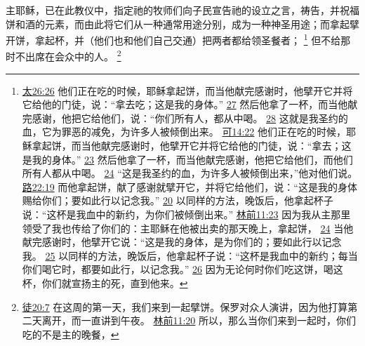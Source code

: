 \documentclass[12pt, a4paper, oneside]{ctexart}
\newcounter{parnum}[section]
\newcommand{\N}{%
   \noindent\refstepcounter{parnum}%
    \makebox[\parindent][l]{\textbf{\arabic{parnum}.}}}
\begin{document}
\N 主耶稣，已在此教仪中，指定祂的牧师们向子民宣告祂的设立之言，祷告，并祝福饼和酒的元素，而由此将它们从一种通常用途分别，成为一种神圣用途；而拿起擘开饼，拿起杯，并（他们也和他们自己交通）把两者都给领圣餐者；
	\footnote {
		\href{https://biblehub.com/matthew/26-26.htm}{太26:26} 他们正在吃的时候，耶稣拿起饼，而当他献完感谢时，他擘开它并将它给他的门徒，说：“拿去吃；这是我的身体。”
		\href{https://biblehub.com/matthew/26-27.htm}{27} 然后他拿了一杯，而当他献完感谢，他把它给他们，说：“你们所有人，都从中喝。
		\href{https://biblehub.com/matthew/26-28.htm}{28} 这就是我圣约的血，它为罪恶的减免，为许多人被倾倒出来。
		\href{https://biblehub.com/mark/14-22.htm}{可14:22} 他们正在吃的时候，耶稣拿起饼，而当他献完感谢时，他擘开它并将它给他的门徒，说：“拿去；这是我的身体。”
		\href{https://biblehub.com/mark/14-23.htm}{23} 然后他拿了一杯，而当他献完感谢，他把它给他们，而他们所有人都从中喝。
		\href{https://biblehub.com/mark/14-24.htm}{24} “这是我圣约的血，为许多人被倾倒出来，”他对他们说。
		\href{https://biblehub.com/luke/22-19.htm}{路22:19} 而他拿起饼，献了感谢就擘开它，并将它给他们，说：“这是我的身体赐给你们；要如此行以记念我。”
		\href{https://biblehub.com/luke/22-20.htm}{20} 以同样的方法，晚饭后，他拿起杯子说：“这杯是我血中的新约，为你们被倾倒出来。”
		\href{https://biblehub.com/1_corinthians/11-23.htm}{林前11:23} 因为我从主那里领受了我也传给了你们的：主耶稣在他被出卖的那天晚上，拿起饼，
		\href{https://biblehub.com/1_corinthians/11-24.htm}{24} 当他献完感谢时，他擘开它说：“这是我的身体，是为你们的；要如此行以记念我。
		\href{https://biblehub.com/1_corinthians/11-25.htm}{25} 以同样的方法，晚饭后，他拿起杯子说：“这杯是我血中的新约；每当你们喝它时，都要如此行，以记念我。”
		\href{https://biblehub.com/1_corinthians/11-26.htm}{26} 因为无论何时你们吃这饼，喝这杯，你们就宣扬主的死，直到他来。
	}
	但不给那时不出席在会众中的人。
	\footnote {
		\href{https://biblehub.com/acts/20-7.htm}{徒20:7} 在这周的第一天，我们来到一起擘饼。保罗对众人演讲，因为他打算第二天离开，而一直讲到午夜。
		\href{https://biblehub.com/1_corinthians/11-20.htm}{林前11:20} 所以，那么当你们来到一起时，你们吃的不是主的晚餐，
	}
\end{document}
